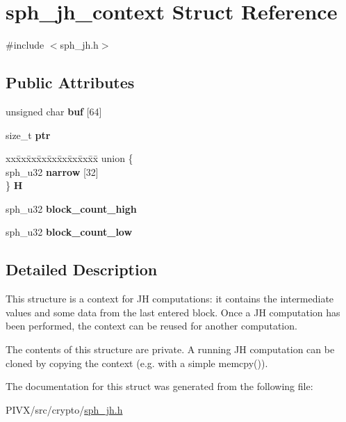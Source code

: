 \hypertarget{structsph__jh__context}{}\section{sph\+\_\+jh\+\_\+context Struct Reference}
\label{structsph__jh__context}


{\ttfamily \#include $<$sph\+\_\+jh.\+h$>$}

\subsection*{Public Attributes}
\begin{DoxyCompactItemize}
\item 
\mbox{\label{structsph__jh__context_a3dc7aa585cff408e168f5d0c5cc61400}} 
unsigned char {\bfseries buf} \mbox{[}64\mbox{]}
\item 
\mbox{\label{structsph__jh__context_aa6880d19dbdea6b710eb36447c4fc835}} 
size\+\_\+t {\bfseries ptr}
\item 
\mbox{\label{structsph__jh__context_aa994b5fb7ec509c80b5306bd4f12f311}} 
\begin{tabbing}
xx\=xx\=xx\=xx\=xx\=xx\=xx\=xx\=xx\=\kill
union \{\\
\>sph\_u32 {\bfseries narrow} \mbox{[}32\mbox{]}\\
\} {\bfseries H}\\

\end{tabbing}\item 
\mbox{\label{structsph__jh__context_a7ae4f4f5695c9d96ced8beeefe9e5114}} 
sph\+\_\+u32 {\bfseries block\+\_\+count\+\_\+high}
\item 
\mbox{\label{structsph__jh__context_a0aefbe622c0463e587bcd8fc257f8ecf}} 
sph\+\_\+u32 {\bfseries block\+\_\+count\+\_\+low}
\end{DoxyCompactItemize}


\subsection{Detailed Description}
This structure is a context for JH computations\+: it contains the intermediate values and some data from the last entered block. Once a JH computation has been performed, the context can be reused for another computation.

The contents of this structure are private. A running JH computation can be cloned by copying the context (e.\+g. with a simple {\ttfamily memcpy()}). 

The documentation for this struct was generated from the following file\+:\begin{DoxyCompactItemize}
\item 
P\+I\+V\+X/src/crypto/\mbox{\hyperlink{sph__jh_8h}{sph\+\_\+jh.\+h}}\end{DoxyCompactItemize}
